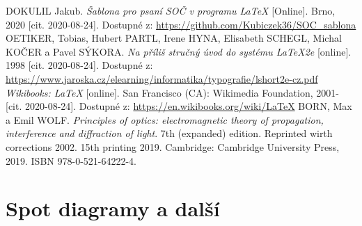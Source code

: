 \documentclass[12pt, a4paper,
 twoside,        %
 openright
]{report}
\begin{document}
\begin{thebibliography}{99}
     DOKULIL Jakub. \textit{Šablona pro psaní SOČ v programu \LaTeX} [Online]. Brno, 2020 [cit. 2020-08-24]. Dostupné z: \url{https://github.com/Kubiczek36/SOC_sablona}
    OETIKER, Tobias, Hubert PARTL, Irene HYNA, Elisabeth SCHEGL, Michal KOČER a Pavel SÝKORA. \textit{Na příliš stručný úvod do systému LaTeX2e} [online]. 1998 [cit. 2020-08-24]. Dostupné z: \url{https://www.jaroska.cz/elearning/informatika/typografie/lshort2e-cz.pdf}
    \textit{Wikibooks: LaTeX} [online]. San Francisco (CA): Wikimedia Foundation, 2001- [cit. 2020-08-24]. Dostupné z: \url{https://en.wikibooks.org/wiki/LaTeX}
    BORN, Max a Emil WOLF. \textit{Principles of optics: electromagnetic theory of propagation, interference and diffraction of light}. 7th (expanded) edition. Reprinted wirth corrections 2002. 15th printing 2019. Cambridge: Cambridge University Press, 2019. ISBN 978-0-521-64222-4.
\end{thebibliography}

\listoffigures

\listoftables

\appendix %

[\vspace{-22pt}] %


\chapter{%
Spot diagramy a další }


\end{document}
